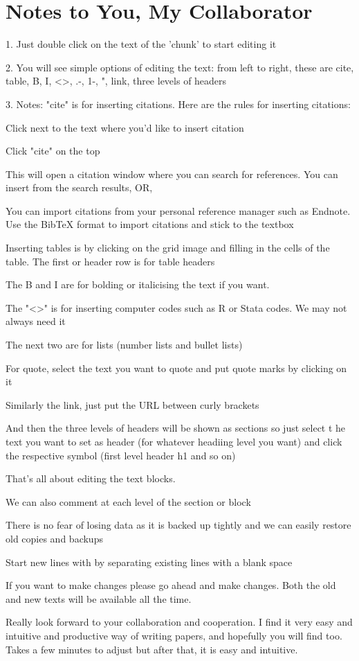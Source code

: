 \section{Notes to You, My Collaborator}

1. Just double click on the text of the 'chunk' to start editing it

2. You will see simple options of editing the text: from left to right, these are cite, table, B, I, <>, .-, 1-, ", link, three levels of headers

3. Notes: "cite" is for inserting citations. Here are the rules for inserting citations:

Click next to the text where you'd like to insert citation

Click "cite" on the top

This will open a citation window where you can search for references. You can insert from the search results, OR,

You can import citations from your personal reference manager such as  Endnote. Use the BibTeX format to import citations and stick to the textbox

Inserting tables is by clicking on the grid image and  filling in the cells of the table. The first or header row is for table headers

The  B and I are for bolding or italicising the text if you want. 

The "<>" is for inserting computer codes such as R or Stata codes. We may not always need it

The next two are for lists (number lists and bullet lists)

For quote, select the text you want to  quote and put quote marks by clicking on it

Similarly the link, just put the URL between curly brackets 

And then the three levels of headers will be shown as sections so just select t he text you want to set as header (for whatever headiing level you want) and click the respective symbol (first level header h1 and so on)

That's all about editing the text blocks.

We can also comment at each  level of the section or block

There is no fear of losing data as it is backed up tightly and we can easily restore  old copies and backups

Start new lines with by separating existing lines with a blank space

If you want to make changes  please go ahead and make changes.  Both the old and new texts will be available all the time.

Really look forward to your collaboration and cooperation. I find it very easy and intuitive and productive way of writing papers, and hopefully  you will find too. Takes a few minutes to adjust but after that, it is easy and intuitive. 


